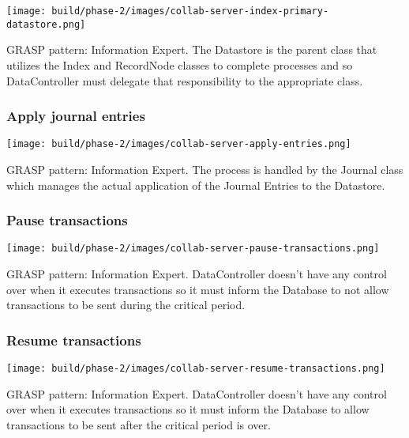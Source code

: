 \documentclass[a4paper]{report}
\begin{document}
			\begin{center}
				\texttt{[image: build/phase-2/images/collab-server-index-primary-datastore.png]}
			\end{center}

			GRASP pattern: Information Expert. The Datastore is the parent class that utilizes the Index and RecordNode classes to complete processes and so DataController must delegate that responsibility to the appropriate class.

		\subsubsection{Apply journal entries}

			\begin{center}
				\texttt{[image: build/phase-2/images/collab-server-apply-entries.png]}
			\end{center}

			GRASP pattern: Information Expert. The process is handled by the Journal class which manages the actual application of the Journal Entries to the Datastore.

		\subsubsection{Pause transactions}

			\begin{center}
				\texttt{[image: build/phase-2/images/collab-server-pause-transactions.png]}
			\end{center}

			GRASP pattern: Information Expert. DataController doesn't have any control over when it executes transactions so it must inform the Database to not allow transactions to be sent during the critical period.

		\subsubsection{Resume transactions}

			\begin{center}
				\texttt{[image: build/phase-2/images/collab-server-resume-transactions.png]}
			\end{center}

			GRASP pattern: Information Expert. DataController doesn't have any control over when it executes transactions so it must inform the Database to allow transactions to be sent after the critical period is over.
\end{document}
